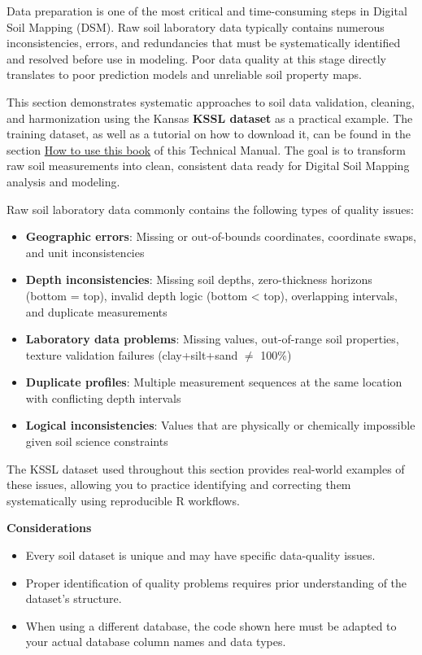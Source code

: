 \documentclass[
  10pt,
  b5paper,
  oneside]{book}
\begin{document}
Data preparation is one of the most critical and time-consuming steps in Digital Soil Mapping (DSM). Raw soil laboratory data typically contains numerous inconsistencies, errors, and redundancies that must be systematically identified and resolved before use in modeling. Poor data quality at this stage directly translates to poor prediction models and unreliable soil property maps.

This section demonstrates systematic approaches to soil data validation, cleaning, and harmonization using the Kansas \textbf{KSSL dataset} as a practical example. The training dataset, as well as a tutorial on how to download it, can be found in the section \hyperref[how-to-use]{How to use this book} of this Technical Manual. The goal is to transform raw soil measurements into clean, consistent data ready for Digital Soil Mapping analysis and modeling.

Raw soil laboratory data commonly contains the following types of quality issues:

\begin{itemize}
\item
  \textbf{Geographic errors}: Missing or out-of-bounds coordinates, coordinate swaps, and unit inconsistencies
\item
  \textbf{Depth inconsistencies}: Missing soil depths, zero-thickness horizons (bottom = top), invalid depth logic (bottom \textless{} top), overlapping intervals, and duplicate measurements
\item
  \textbf{Laboratory data problems}: Missing values, out-of-range soil properties, texture validation failures (clay+silt+sand \(\neq\) 100\%)
\item
  \textbf{Duplicate profiles}: Multiple measurement sequences at the same location with conflicting depth intervals
\item
  \textbf{Logical inconsistencies}: Values that are physically or chemically impossible given soil science constraints
\end{itemize}

The KSSL dataset used throughout this section provides real-world examples of these issues, allowing you to practice identifying and correcting them systematically using reproducible R workflows.

\textbf{Considerations}

\begin{itemize}
\item
  Every soil dataset is unique and may have specific data-quality issues.
\item
  Proper identification of quality problems requires prior understanding of the dataset's structure.
\item
  When using a different database, the code shown here must be adapted to your actual database column names and data types.
\end{itemize}
\end{document}
